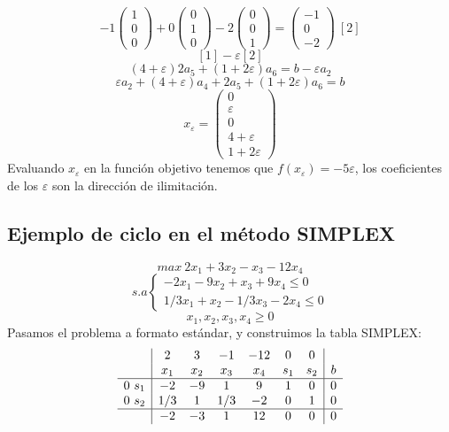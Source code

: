 \documentclass[11pt,fleqn]{book} %
\begin{document}
$$-1 \left(\begin{array}{c}
1 \\ 0 \\ 0
\end{array}\right)+0\left(\begin{array}{c}
0 \\ 1 \\ 0
\end{array}\right)-2\left(\begin{array}{c}
0 \\ 0 \\ 1
\end{array}\right)=\left(\begin{array}{c}
-1 \\ 0 \\ -2
\end{array}\right) ~ [2]$$
$$[1]-\varepsilon[2]$$
$$(4+\varepsilon)2a_5+(1+2\varepsilon)a_6=b-\varepsilon a_2 $$
$$ \varepsilon a_2 + (4+\varepsilon)a_4+2a_5+(1+2\varepsilon)a_6=b$$
$$ x_\varepsilon=\left(\begin{array}{c}
0 \\ \varepsilon \\ 0 \\ 4 + \varepsilon \\ 1 + 2\varepsilon
\end{array}\right)$$
Evaluando $x_\varepsilon$ en la función objetivo tenemos que $f(x_\varepsilon)=-5 \varepsilon$, los coeficientes de los $\varepsilon$ son la dirección de ilimitación.

\subsection{Ejemplo de ciclo en el método SIMPLEX}
$$ max ~2x_1+3x_2-x_3-12x_4$$
$$s.a \left\{
\begin{array}{c}
-2x_1-9x_2+x_3+9x_4 \leq 0 \\
1/3x_1+x_2-1/3x_3-2x_4 \leq 0
\end{array}
\right.
$$
$$x_1, x_2, x_3, x_4 \geq 0$$
Pasamos el problema a formato estándar, y construimos la tabla SIMPLEX:
$$
\begin{array}{c|cccccc|c}
& 2 & 3 & -1 & -12 & 0 & 0 & \\
& x_1 & x_2 & x_3 & x_4 & s_1 & s_2 & b \\ \hline
0 ~ s_1 & -2 & -9 & 1 & 9 & 1 & 0 & 0 \\
0 ~ s_2 & 1/3 & 1 & 1/3 & -2 & 0 & 1 & 0 \\ \hline
& -2 & -3 & 1 & 12 & 0 & 0 & 0
\end{array}
$$
\end{document}

